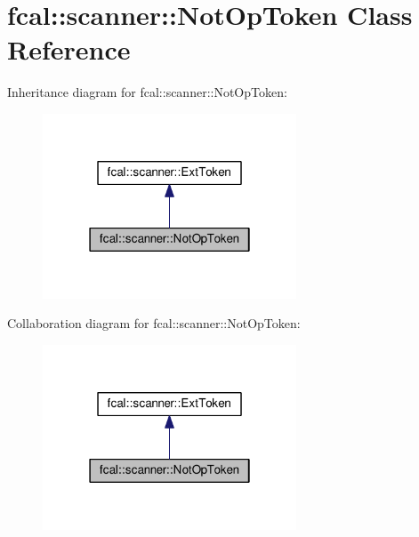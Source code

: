 \hypertarget{classfcal_1_1scanner_1_1NotOpToken}{}\section{fcal\+:\+:scanner\+:\+:Not\+Op\+Token Class Reference}
\label{classfcal_1_1scanner_1_1NotOpToken}


Inheritance diagram for fcal\+:\+:scanner\+:\+:Not\+Op\+Token\+:\nopagebreak
\begin{figure}[H]
\begin{center}
\leavevmode
\includegraphics[width=214pt]{classfcal_1_1scanner_1_1NotOpToken__inherit__graph}
\end{center}
\end{figure}


Collaboration diagram for fcal\+:\+:scanner\+:\+:Not\+Op\+Token\+:\nopagebreak
\begin{figure}[H]
\begin{center}
\leavevmode
\includegraphics[width=214pt]{classfcal_1_1scanner_1_1NotOpToken__coll__graph}
\end{center}
\end{figure}
